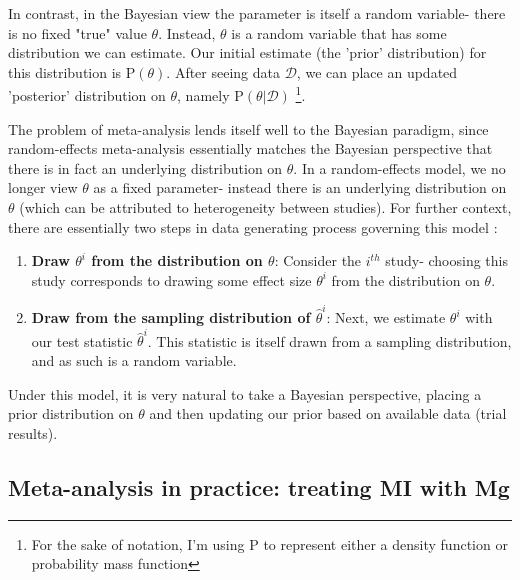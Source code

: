 \documentclass[fleqn,10pt]{SelfArx} %
\begin{document}
In contrast, in the Bayesian view the parameter is itself a random variable- there is no fixed "true" value $\theta$. Instead, $\theta$ is a random variable that has some distribution we can estimate. Our initial estimate (the 'prior' distribution) for this distribution is P$(\theta)$. After seeing data $\mathcal{D}$, we can place an updated 'posterior' distribution on $\theta$, namely P$(\theta | \mathcal{D})$ \footnote{For the sake of notation, I'm using P to represent either a density function or probability mass function}.

The problem of meta-analysis lends itself well to the Bayesian paradigm, since random-effects meta-analysis essentially matches the Bayesian perspective that there is in fact an underlying distribution on $\theta$. In a random-effects model, we no longer view $\theta$ as a fixed parameter- instead there is an underlying distribution on $\theta$ (which can be attributed to heterogeneity between studies). For further context, there are essentially two steps in data generating process governing this model \cite{Hedges}:
\begin{enumerate}
\item \textbf{Draw $\theta^i$ from the distribution on $\theta$}: Consider the $i^{th}$ study- choosing this study corresponds to drawing some effect size $\theta^i$ from the distribution on $\theta$.
\item \textbf{Draw from the sampling distribution of $\hat{\theta}^i$}: Next, we estimate $\theta^i$ with our test statistic $\hat{\theta}^i$. This statistic is itself drawn from a sampling distribution, and as such is a random variable.
\end{enumerate}
Under this model, it is very natural to take a Bayesian perspective, placing a prior distribution on $\theta$ and then updating our prior based on available data (trial results).

\subsection*{Meta-analysis in practice: treating MI with Mg}
\end{document}
